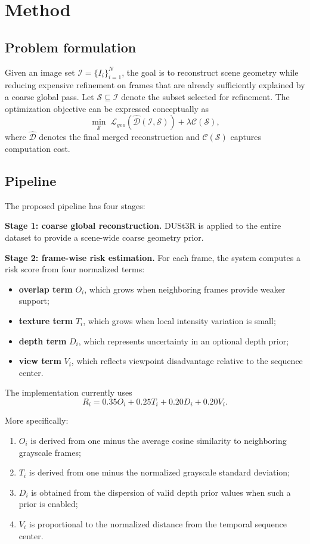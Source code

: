 \documentclass[preprint,12pt]{elsarticle}
\begin{document}
\section{Method}

\subsection{Problem formulation}

Given an image set $\mathcal{I}=\{I_i\}_{i=1}^N$, the goal is to reconstruct scene geometry while reducing expensive refinement on frames that are already sufficiently explained by a coarse global pass. Let $\mathcal{S}\subseteq \mathcal{I}$ denote the subset selected for refinement. The optimization objective can be expressed conceptually as
\[
\min_{\mathcal{S}} \; \mathcal{L}_{geo}(\hat{\mathcal{D}}(\mathcal{I},\mathcal{S})) + \lambda \mathcal{C}(\mathcal{S}),
\]
where $\hat{\mathcal{D}}$ denotes the final merged reconstruction and $\mathcal{C}(\mathcal{S})$ captures computation cost.

\subsection{Pipeline}

The proposed pipeline has four stages:

\textbf{Stage 1: coarse global reconstruction.}
DUSt3R is applied to the entire dataset to provide a scene-wide coarse geometry prior.

\textbf{Stage 2: frame-wise risk estimation.}
For each frame, the system computes a risk score from four normalized terms:
\begin{itemize}[leftmargin=1.5em]
  \item \textbf{overlap term} $O_i$, which grows when neighboring frames provide weaker support;
  \item \textbf{texture term} $T_i$, which grows when local intensity variation is small;
  \item \textbf{depth term} $D_i$, which represents uncertainty in an optional depth prior;
  \item \textbf{view term} $V_i$, which reflects viewpoint disadvantage relative to the sequence center.
\end{itemize}

The implementation currently uses
\[
R_i = 0.35 O_i + 0.25 T_i + 0.20 D_i + 0.20 V_i.
\]

More specifically:
\begin{enumerate}[leftmargin=1.5em]
  \item $O_i$ is derived from one minus the average cosine similarity to neighboring grayscale frames;
  \item $T_i$ is derived from one minus the normalized grayscale standard deviation;
  \item $D_i$ is obtained from the dispersion of valid depth prior values when such a prior is enabled;
  \item $V_i$ is proportional to the normalized distance from the temporal sequence center.
\end{enumerate}
\end{document}
